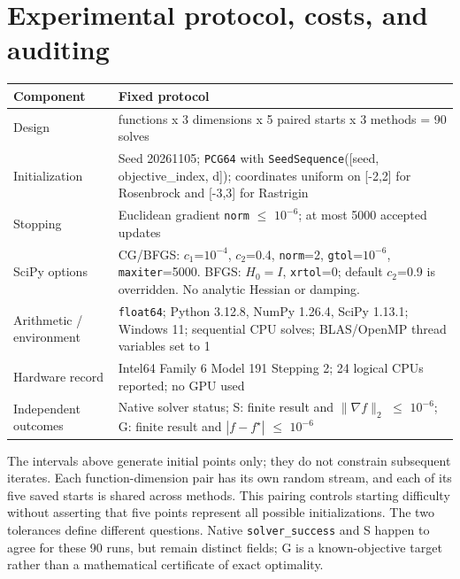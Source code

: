\documentclass[10pt]{article}
\begin{document}
\newpage
\setcounter{section}{4}
\section{Experimental protocol, costs, and auditing}
\begingroup
\fontsize{8}{9.2}\selectfont
\setlength{\tabcolsep}{3pt}
\renewcommand{\arraystretch}{1.05}
\centering
\begin{tabular}{@{}>{\raggedright\arraybackslash}p{}>{\raggedright\arraybackslash}p{}@{}}
\toprule
\textbf{Component} & \textbf{Fixed protocol} \\
\midrule
Design & 2 functions x 3 dimensions x 5 paired starts x 3 methods = 90 solves \\
Initialization & Seed 20261105; \texttt{PCG64} with \texttt{SeedSequence}([seed, objective\_index, d]); coordinates uniform on [-2,2] for Rosenbrock and [-3,3] for Rastrigin \\
Stopping & Euclidean gradient \texttt{norm} \(\leq\) \(10^{-6}\); at most 5000 accepted updates \\
SciPy options & CG/BFGS: \(c_1\)=\(10^{-4}\), \(c_2\)=0.4, \texttt{norm}=2, \texttt{gtol}=\(10^{-6}\), \texttt{maxiter}=5000. BFGS: \(H_0=I\), \texttt{xrtol}=0; default \(c_2\)=0.9 is overridden. No analytic Hessian or damping. \\
Arithmetic / environment & \texttt{float64}; Python 3.12.8, NumPy 1.26.4, SciPy 1.13.1; Windows 11; sequential CPU solves; BLAS/OpenMP thread variables set to 1 \\
Hardware record & Intel64 Family 6 Model 191 Stepping 2; 24 logical CPUs reported; no GPU used \\
Independent outcomes & Native solver status; S: finite result and \(\|\nabla f\|_2\) \(\leq\) \(10^{-6}\); G: finite result and \(|f-f^\star|\) \(\leq\) \(10^{-6}\) \\
\bottomrule
\end{tabular}\par
\endgroup
\smallskip
The intervals above generate initial points only; they do not constrain subsequent iterates. Each function-dimension pair has its own random stream, and each of its five saved starts is shared across methods. This pairing controls starting difficulty without asserting that five points represent all possible initializations. The two tolerances define different questions. Native \texttt{solver\_success} and S happen to agree for these 90 runs, but remain distinct fields; G is a known-objective target rather than a mathematical certificate of exact optimality.
\end{document}
